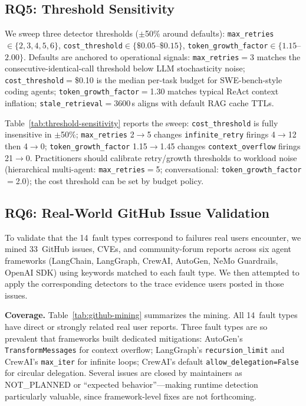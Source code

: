 \documentclass[sigconf,screen]{acmart}
\begin{document}
\subsection{RQ5: Threshold Sensitivity}
\label{sec:thresholds}

We sweep three detector thresholds ($\pm$50\% around defaults):
\texttt{max\_retries}$\in\{2,3,4,5,6\}$,
\texttt{cost\_threshold}$\in\{\$0.05$--$\$0.15\}$,
\texttt{token\_growth\_factor}$\in\{1.15$--$2.00\}$.
Defaults are anchored to operational signals: \texttt{max\_retries}$=$3
matches the consecutive-identical-call threshold below LLM stochasticity
noise; \texttt{cost\_threshold}$=$\$0.10 is the median per-task budget
for SWE-bench-style coding agents; \texttt{token\_growth\_factor}$=$1.30
matches typical ReAct context inflation;
\texttt{stale\_retrieval}$=$3600\,s aligns with default RAG cache TTLs.

Table~\ref{tab:threshold-sensitivity} reports the sweep:
\texttt{cost\_threshold} is fully insensitive in $\pm$50\%;
\texttt{max\_retries} 2$\to$5 changes \texttt{infinite\_retry} firings
4$\to$12 then 4$\to$0; \texttt{token\_growth\_factor} 1.15$\to$1.45
changes \texttt{context\_overflow} firings 21$\to$0.  Practitioners
should calibrate retry/growth thresholds to workload noise (hierarchical
multi-agent: \texttt{max\_retries}$=$5; conversational:
\texttt{token\_growth\_factor}$=$2.0); the cost threshold can be set by
budget policy.



\subsection{RQ6: Real-World GitHub Issue Validation}
\label{sec:githubmining}

To validate that the 14~fault types correspond to failures real users
encounter, we mined 33~GitHub issues, CVEs, and community-forum reports
across six agent frameworks (LangChain, LangGraph, CrewAI, AutoGen,
NeMo Guardrails, OpenAI SDK) using keywords matched to each fault
type.  We then attempted to apply the corresponding detectors to the
trace evidence users posted in those issues.

\textbf{Coverage.}
Table~\ref{tab:github-mining} summarizes the mining.  All 14~fault
types have direct or strongly related real user reports.  Three
fault types are so prevalent that frameworks built dedicated
mitigations: AutoGen's \texttt{TransformMessages} for context overflow;
LangGraph's \texttt{recursion\_limit} and CrewAI's \texttt{max\_iter}
for infinite loops; CrewAI's default \texttt{allow\_delegation=False}
for circular delegation.  Several issues are closed by maintainers as
NOT\_PLANNED or ``expected behavior''---making runtime detection
particularly valuable, since framework-level fixes are not forthcoming.
\end{document}
